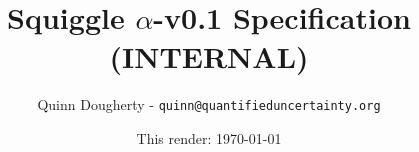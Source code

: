 \documentclass{article}
\title{Squiggle $\alpha$-v0.1 Specification (INTERNAL)}
\author{Quinn Dougherty - \texttt{quinn@quantifieduncertainty.org}}
\date{This render: \today}
\begin{document}
\maketitle{}

\nocite{*}




\printbibliography
\end{document}
